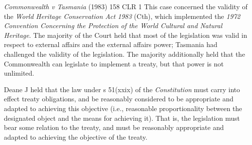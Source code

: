 \begin{casedetails}{\textit{Commonwealth v Tasmania} (1983) 158 CLR 1}
    \flushleft
    This case concerned the validity of the \textit{World Heritage Conservation Act 1983} (Cth), which implemented the \textit{1972 Convention Concerning the Protection of the World Cultural and Natural Heritage}. The majority of the Court held that most of the legislation was valid in respect to external affairs and the external affairs power; Tasmania had challenged the validity of the legislation. The majority additionally held that the Commonwealth can legislate to implement a treaty, but that power is not unlimited.

    \vspace{\baselineskip}

    Deane J held that the law under s 51(xxix) of the \textit{Constitution} must carry into effect treaty obligations, and be reasonably considered to be appropriate and adapted to achieving this objective (i.e., reasonable proportionality between the designated object and the means for achieving it). That is, the legislation must bear some relation to the treaty, and must be reasonably appropriate and adapted to achieving the objective of the treaty.
\end{casedetails}

